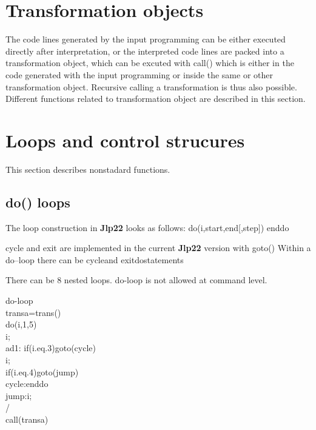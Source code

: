 \section{Transformation objects}
\label{Transformations}
The code lines generated by the input programming can be either
executed directly after interpretation, or the interpreted code lines
are packed into a transformation object, which can be excuted with \textcolor{VioletRed}{call}()
which is either in the code generated with the input programming
or inside the same or other transformation object. Recursive
calling a transformation is thus also possible. Different functions
related to transformation object are described in this section.
\section{Loops and control strucures}
\label{loops}
This section describes nonstadard functions.
\subsection{\textcolor{VioletRed}{do}() loops}
\label{do}

The loop construction in \textbf{Jlp22} looks as follows:
\textcolor{VioletRed}{do}(i,start,end[,step])
enddo
\begin{note}
cycle and exit are implemented in the current \textbf{Jlp22} version with \textcolor{VioletRed}{goto}()
Within a do–loop there can be cycleand exitdostatements
\end{note}
\begin{note}
There can be 8 nested loops. do-loop is not allowed at command level.
\end{note}
\begin{example}[doex]do-loop\\
\label{doex}
transa=\textcolor{VioletRed}{trans}()\\
\textcolor{VioletRed}{do}(i,1,5)\\
i;\\
ad1: \textcolor{VioletRed}{if}(i.eq.3)\textcolor{VioletRed}{goto}(cycle)\\
i;\\
\textcolor{VioletRed}{if}(i.eq.4)\textcolor{VioletRed}{goto}(jump)\\
cycle:enddo\\
jump:i;\\
/\\
\textcolor{VioletRed}{call}(transa)
\end{example}

